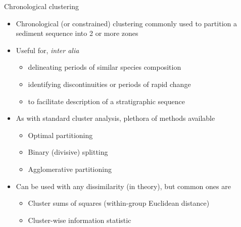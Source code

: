 \documentclass[10pt,ignorenonframetext,compress, aspectratio=169]{beamer}
\providecommand{\tightlist}{%
  \setlength{\itemsep}{0pt}\setlength{\parskip}{0pt}}
\begin{document}
\begin{frame}{Chronological clustering}

\begin{itemize}
\tightlist
\item
  Chronological (or constrained) clustering commonly used to partition a
  sediment sequence into 2 or more zones
\item
  Useful for, \emph{inter alia}

  \begin{itemize}
  \tightlist
  \item
    delineating periods of similar species composition
  \item
    identifying discontinuities or periods of rapid change
  \item
    to facilitate description of a stratigraphic sequence
  \end{itemize}
\item
  As with standard cluster analysis, plethora of methods available

  \begin{itemize}
  \tightlist
  \item
    Optimal partitioning
  \item
    Binary (divisive) splitting
  \item
    Agglomerative partitioning
  \end{itemize}
\item
  Can be used with any dissimilarity (in theory), but common ones are

  \begin{itemize}
  \tightlist
  \item
    Cluster sums of squares (within-group Euclidean distance)
  \item
    Cluster-wise information statistic
  \end{itemize}
\end{itemize}

\end{frame}
\end{document}
